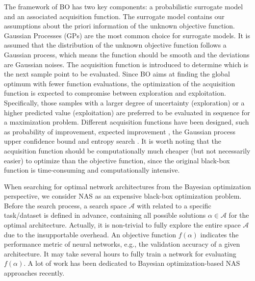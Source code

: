 \documentclass[journal]{IEEEtran}
\begin{document}
The framework of BO has two key components: a probabilistic surrogate model and an associated acquisition function. The surrogate model contains our assumptions about the priori information of the unknown objective function. Gaussian Processes (GPs) are the most common choice for surrogate models. It is assumed that the distribution of the unknown objective function follows a Gaussian process, which means the function should be smooth and the deviations are Gaussian noises. The acquisition function is introduced to determine which is the next sample point to be evaluated. Since BO aims at finding the global optimum with fewer function evaluations, the optimization of the acquisition function is expected to compromise between exploration and exploitation. Specifically, those samples with a larger  degree of uncertainty (exploration) or a higher predicted value (exploitation) are preferred to be evaluated in sequence for a maximization problem. Different acquisition functions have been designed, such as probability of improvement, expected improvement \cite{mockus1978application}, the Gaussian process upper confidence bound \cite{srinivas2010gaussian} and entropy search \cite{hennig2012entropy}. It is worth noting that the acquisition function should be computationally much cheaper (but not necessarily easier) to optimize than the objective function, since the original black-box function is time-consuming and computationally intensive.

When searching for optimal network architectures from the Bayesian optimization perspective, we consider NAS as an expensive black-box optimization problem. Before the search process, a search space $\mathcal{A}$ with related to a specific task/dataset is defined in advance, containing all possible solutions $\alpha \in \mathcal{A}$ for the optimal architecture. Actually, it is non-trivial to fully explore the entire space $\mathcal{A}$ due to the insupportable overhead. An objective function $f(\alpha)$ indicates the performance metric of neural networks, e.g., the validation accuracy of a given architecture. It may take several hours to fully train a network for evaluating $f(\alpha)$. A lot of work has been dedicated to Bayesian optimization-based NAS approaches recently. 
\end{document}
